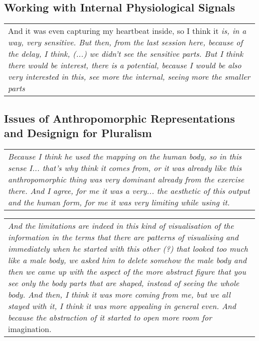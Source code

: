 \subsection{Working with Internal Physiological Signals}

\begin{center}
\begin{tabular}{ p{13cm}} 
And it was even capturing my heartbeat inside, so I think it \textit{is, in a way, very sensitive. But then, from the last session here, because of the delay, I think, (...) we didn't see the sensitive parts. But I think there would be interest, there is a potential, because I would be also very interested in this, see more the internal, seeing more the smaller parts}
\end{tabular}
\end{center}

\subsection{Issues of Anthropomorphic Representations and Designign for Pluralism}

\begin{center}
\begin{tabular}{ p{13cm}} 
\textit{Because I think he used the mapping on the human body, so in this sense I... that's why  think it comes from, or it was already like this anthropomorphic thing was very dominant already from the exercise there. And I agree, for me it was a very... the aesthetic of this output and the human form, for me it was very limiting while using it.}
\end{tabular}
\end{center}

\begin{center}
\begin{tabular}{ p{13cm}} 
\textit{And the limitations are indeed in this kind of visualisation of the information in the terms that there are patterns of visualising and immediately when he started with this other (?) that looked too much like a male body, we asked him to delete somehow the male body and then we came up with the aspect of the more abstract figure that you see only the body parts that are shaped, instead of seeing the whole body. And then, I think it was more coming from me, but we all stayed with it, I think it was more appealing in general even. And because the abstraction of it started to open more room for} imagination.
\end{tabular}
\end{center}

